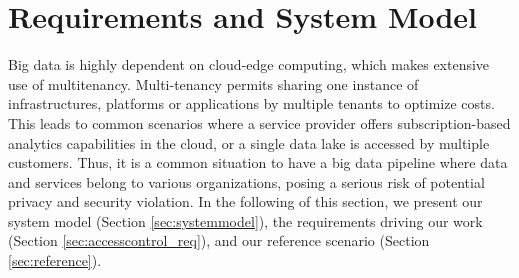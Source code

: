 \section{Requirements and System Model}\label{sec:requirements}
Big data is highly dependent on cloud-edge computing, which makes extensive use of multitenancy.
Mul\-ti-te\-nan\-cy permits sharing one instance of infrastructures, platforms or applications by multiple tenants to optimize costs.
This leads to common scenarios where a service provider offers subscription-based analytics capabilities in the cloud,
or a single data lake is accessed by multiple customers.
Thus, it is a common situation to have a big data pipeline where data and services belong to various organizations,
posing a serious risk of potential privacy and security violation.
In the following of this section,
we present our system model (Section \ref{sec:systemmodel}),
the requirements driving our work (Section \ref{sec:accesscontrol_req}),
and our reference scenario (Section \ref{sec:reference}).

